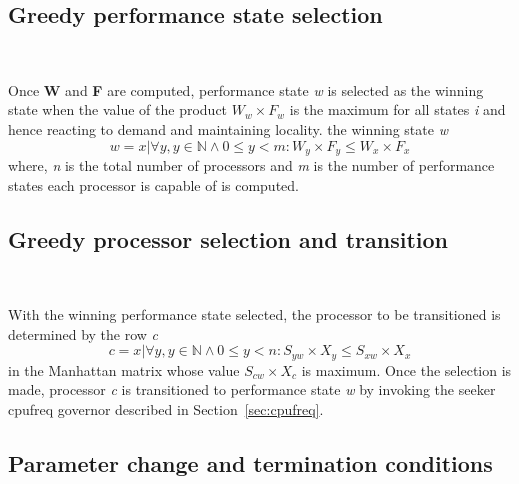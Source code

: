 \subsection{Greedy performance state selection}~\label{sec:winner_state}

Once \textbf{W} and \textbf{F} are computed, performance state \textit{w} is selected
as the winning state when the value of the product $W_w \times F_w$ is the maximum 
for all states \textit{i} and hence reacting to demand and maintaining locality. 
the winning state \textit{w}
\begin{equation}
    w = {x | \forall y, y \in \mathbb{N} \wedge 0 \leq y < m : W_y \times F_y \leq W_x \times F_x}
\label{eq:winning_state}
\end{equation}
where, \textit{n} is the total number of processors and \textit{m} is the number of
performance states each processor is capable of is computed.

\subsection{Greedy processor selection and transition}~\label{sec:winner_proc}

With the winning performance state selected, the processor to be transitioned
is determined by the row \textit{c}
\begin{equation}
    c = {x | \forall y, y \in \mathbb{N} \wedge 0 \leq y < n : S_{yw} \times X_y \leq S_{xw} \times X_x}
\label{eq:winning_proc}
\end{equation}
in the Manhattan matrix whose value $S_{cw} \times X_c$ is maximum.
Once the selection is made, processor \textit{c} is transitioned to performance state
\textit{w} by invoking the seeker cpufreq governor described in Section~\ref{sec:cpufreq}.


\subsection{Parameter change and termination conditions}~\label{sec:param_adjust}

